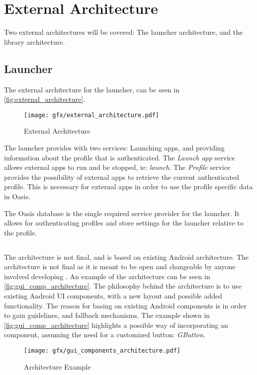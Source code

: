\section{External Architecture}
Two external architectures will be covered: The launcher architecture, and the \guicomponents[] library architecture.

\subsection{Launcher}
The external architecture for the launcher, can be seen in \autoref{fig:external_architecture}.
\begin{figure}[h]
	\centering
	\texttt{[image: gfx/external\_architecture.pdf]}
	\caption{External Architecture}
	\label{fig:external_architecture}
\end{figure}
The launcher provides with two services: Launching apps, and providing information about the profile that is authenticated. The \textit{Launch app} service allows external apps to run and be stopped, ie: \textit{launch}.
The \textit{Profile} service provides the possibility of external apps to retrieve the current authenticated profile.
This is necessary for external apps in order to use the profile specific data in Oasis.

The Oasis database is the single required service provider for the launcher.
It allows for authenticating profiles and store settings for the launcher relative to the profile.

\subsection{\guicomponents[]}
The \guicomponents[] architecture is not final, and is based on existing Android architecture. The architecture is not final as it is meant to be open and changeable by anyone involved developing \giraf[]. An example of the architecture can be seen in \autoref{fig:gui_comp_architecture}.
The philosophy behind the architecture is to use existing Android UI components, with a new layout and possible added functionality.
The reason for basing on existing Android components is in order to gain guidelines, and fallback mechanisms.
The example shown in \autoref{fig:gui_comp_architecture} highlights a possible way of incorporating an component, assuming the need for a customized button: \textit{GButton}. 
\begin{figure}[h]
	\centering
	\texttt{[image: gfx/gui\_components\_architecture.pdf]}
	\caption{\guicomponents[] Architecture Example}
	\label{fig:gui_comp_architecture}
\end{figure}

